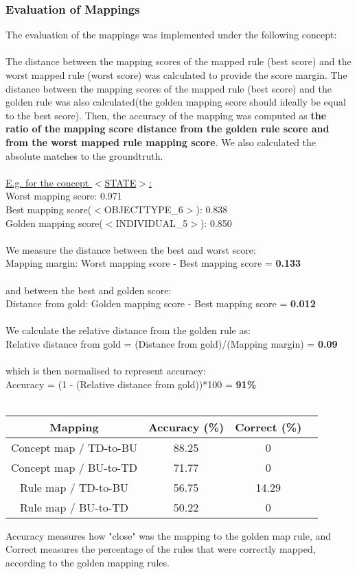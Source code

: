 \documentclass[a4paper,10pt]{article}
\begin{document}
\subsubsection{Evaluation of Mappings}
The evaluation of the mappings was implemented under the following concept:\\\\
The distance between the mapping scores of the mapped rule (best score) and the worst mapped rule (worst score) was calculated to provide the score margin. The distance between the mapping scores of the mapped rule (best score) and the golden rule was also calculated(the golden mapping score should ideally be equal to the best score). Then, the accuracy of the mapping was computed as \textbf{the ratio of the mapping score distance from the golden rule score and from the worst mapped rule mapping score}. We also calculated the absolute matches to the groundtruth.\\\\
\underline{E.g. for the concept $<$STATE$>$:}\\
Worst mapping score: 0.971\\
Best mapping score($<$OBJECTTYPE\_6$>$): 0.838 \\
Golden mapping score($<$INDIVIDUAL\_5$>$): 0.850\\
\\
We measure the distance between the best and worst score:\\
Mapping margin: Worst mapping score - Best mapping score = \textbf{0.133}\\\\
and between the best and golden score:\\
Distance from gold: Golden mapping score - Best mapping score = \textbf{0.012}\\\\
We calculate the relative distance from the golden rule as:\\
Relative distance from gold = (Distance from gold)/(Mapping margin) = \textbf{0.09}\\\\
which is then normalised to represent accuracy:\\
Accuracy = (1 - (Relative distance from gold))*100 = \textbf{91\%}\\\\
\begin{center}
 \label{tab:title} 
\begin{tabular}{|c||c|c|c|}
\hline
Mapping&Accuracy (\%)&Correct (\%)\\
\hline
\hline
Concept map / TD-to-BU&88.25&0 \\
\hline
Concept map / BU-to-TD&71.77&0 \\
\hline
Rule map / TD-to-BU&56.75&14.29 \\
\hline
Rule map / BU-to-TD&50.22&0 \\
\hline
\end{tabular}
\end{center}Accuracy measures how "close" was the mapping to the golden map rule, and Correct measures the percentage of the rules that were correctly mapped, according to the golden mapping rules.
\pagebreak
\end{document}

